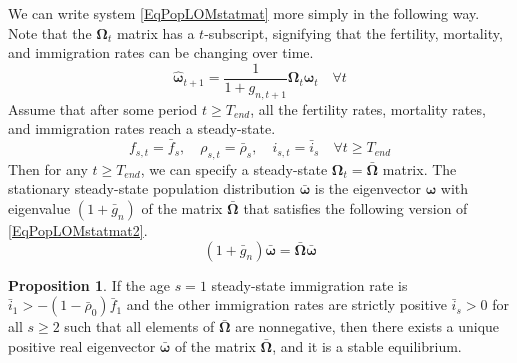 \documentclass[letterpaper,12pt]{article}
\theoremstyle{definition}
\newtheorem{proposition}{Proposition} %
\begin{document}
    We can write system \eqref{EqPopLOMstatmat} more simply in the following way. Note that the $\bm{\Omega}_t$ matrix has a $t$-subscript, signifying that the fertility, mortality, and immigration rates can be changing over time.
    \begin{equation}\label{EqPopLOMstatmat2}
      \bm{\hat{\omega}}_{t+1} = \frac{1}{1+g_{n,t+1}}\bm{\Omega}_t\bm{\hat{\omega}}_t \quad\forall t
    \end{equation}
    Assume that after some period $t\geq T_{end}$, all the fertility rates, mortality rates, and immigration rates reach a steady-state.
    \begin{equation}\label{EqFertMortImmSS}
      f_{s,t} = \bar{f}_s,\quad \rho_{s,t}=\bar{\rho}_s, \quad i_{s,t}=\bar{i}_s \quad\forall t\geq T_{end}
    \end{equation}
    Then for any $t\geq T_{end}$, we can specify a steady-state $\bm{\Omega}_t=\bm{\bar{\Omega}}$ matrix. The stationary steady-state population distribution $\bm{\bar{\omega}}$ is the eigenvector $\bm{\omega}$ with eigenvalue $(1+\bar{g}_n)$ of the matrix $\bm{\bar{\Omega}}$ that satisfies the following version of \eqref{EqPopLOMstatmat2}.
    \begin{equation}\label{EqPopLOMss}
      (1+\bar{g}_n)\bm{\bar{\omega}} = \bm{\bar{\Omega}}\bm{\bar{\omega}}
    \end{equation}

    \begin{proposition}
      If the age $s=1$ steady-state immigration rate is $\bar{i}_1>-(1-\bar{\rho}_0)\bar{f}_1$ and the other immigration rates are strictly positive $\bar{i}_s>0$ for all $s\geq 2$ such that all elements of $\bm{\bar{\Omega}}$ are nonnegative, then there exists a unique positive real eigenvector $\bm{\bar{\omega}}$ of the matrix $\bm{\bar{\Omega}}$, and it is a stable equilibrium.
    \end{proposition}
\end{document}
